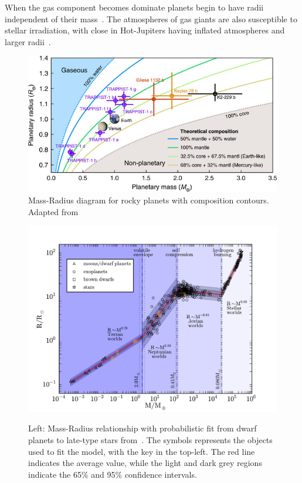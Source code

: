When the gas component becomes dominate planets begin to have radii independent of their mass~\citep[e.g.][]{lopez_understanding_2014}.
The atmospheres of gas giants are also susceptible to stellar irradiation, with close in Hot-Jupiters having inflated atmospheres and larger radii~\citep[e.g][]{fortney_interior_2010}.

\begin{figure}
    \centering
    \includegraphics[width=0.7\linewidth]{figures/introduction/santerne_2018}
    \caption{Mass-Radius diagram for rocky planets with composition contours.
        Adapted from~\citet{santerne_earthsized_2018}}
    \label{fig:santerne2018}
\end{figure}


\begin{figure}
    \centering
    \includegraphics[width=0.7\linewidth]{./figures/introduction/mass_radius_relation.pdf}  \\
    \caption{Left: Mass-Radius relationship with probabilistic fit from dwarf planets to late-type stars from~\citet{chen_probabilistic_2016}.
    The symbols represents the objects used to fit the model, with the key in the top-left.
    The red line indicates the average value, while the light and dark grey regions indicate the 65\% and 95\% confidence intervals.}
    \label{fig:mass_radius_relation}
\end{figure}

